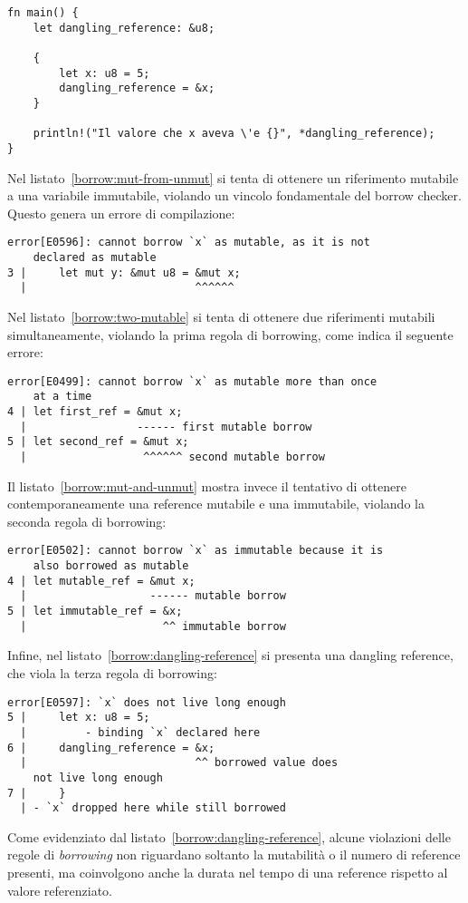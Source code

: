 \begin{lstlisting}[style=ruststyle, caption={Reference non valida: \textit{dangling reference}}, label={borrow:dangling-reference}]
fn main() {
    let dangling_reference: &u8;

    {
        let x: u8 = 5;
        dangling_reference = &x;
    }

    println!("Il valore che x aveva \'e {}", *dangling_reference);
}
\end{lstlisting}
Nel listato~\ref{borrow:mut-from-unmut} si tenta di ottenere un riferimento mutabile a una variabile immutabile, violando un vincolo fondamentale del borrow checker. Questo genera un errore di compilazione:
\begin{verbatim}
error[E0596]: cannot borrow `x` as mutable, as it is not 
    declared as mutable
3 |     let mut y: &mut u8 = &mut x;
  |                          ^^^^^^
\end{verbatim}
\noindent Nel listato~\ref{borrow:two-mutable} si tenta di ottenere due riferimenti mutabili simultaneamente, violando la prima regola di borrowing, come indica il seguente errore:
\begin{verbatim}
error[E0499]: cannot borrow `x` as mutable more than once 
    at a time
4 | let first_ref = &mut x;
  |                 ------ first mutable borrow
5 | let second_ref = &mut x;
  |                  ^^^^^^ second mutable borrow
\end{verbatim}
\noindent Il listato~\ref{borrow:mut-and-unmut} mostra invece il tentativo di ottenere contemporaneamente una reference mutabile e una immutabile, violando la seconda regola di borrowing:
\begin{verbatim}
error[E0502]: cannot borrow `x` as immutable because it is 
    also borrowed as mutable
4 | let mutable_ref = &mut x;
  |                   ------ mutable borrow
5 | let immutable_ref = &x;
  |                     ^^ immutable borrow
\end{verbatim}
\noindent Infine, nel listato~\ref{borrow:dangling-reference} si presenta una dangling reference, che viola la terza regola di borrowing:
\begin{verbatim}
error[E0597]: `x` does not live long enough
5 |     let x: u8 = 5;
  |         - binding `x` declared here
6 |     dangling_reference = &x;
  |                          ^^ borrowed value does 
    not live long enough
7 |     }
  | - `x` dropped here while still borrowed
\end{verbatim}
\vspace{5pt}
Come evidenziato dal listato~\ref{borrow:dangling-reference}, alcune violazioni delle regole di \textit{borrowing} non riguardano soltanto la mutabilità o il numero di reference presenti, ma coinvolgono anche la durata nel tempo di una reference rispetto al valore referenziato.

